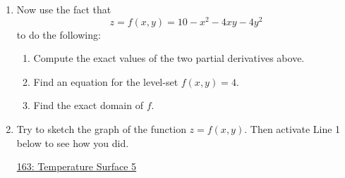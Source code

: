 \documentclass{ximera}
\begin{document}
\begin{example}
\begin{enumerate}
\item Now use the fact that
\[
    z = f(x,y) = 10-x^{2}-4xy-4y^{2}
\]
to do the following:

\begin{enumerate}
\item Compute the exact values of the two partial derivatives above.

\item Find an equation for the level-set $f(x,y)=4$.

\item Find the exact domain of $f$.

\end{enumerate}

\item Try to sketch the graph of the function $z=f(x,y)$. Then activate Line 1 below to see how you did.

\begin{onlineOnly}
    \begin{center}
\end{center}
\end{onlineOnly}

\href{https://www.desmos.com/3d/1wotfuswsf}{163: Temperature Surface 5}

\end{enumerate}

\end{example}
\end{document}
